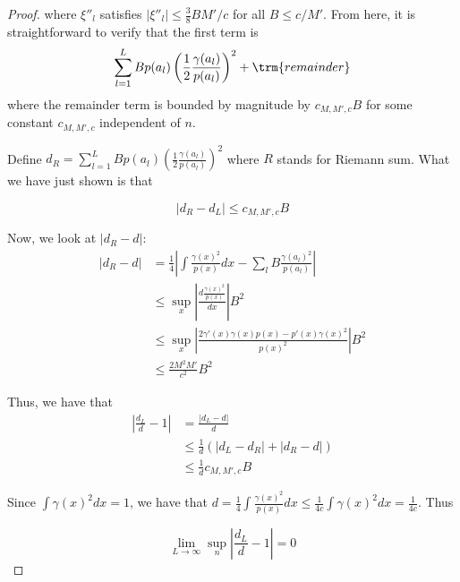 \documentclass{article}
\begin{document}
\begin{proof}
where $\xi''_l$ satisfies $| \xi''_l | \leq \frac{3}{8} B M'/c$ for all $B \leq c / M'$. From here, it is straightforward to verify that the first term is 
\[
\sum_{l=1}^L Bp(a_l) \left( \frac{1}{2} \frac{\gamma(a_l)}{p(a_l)} \right)^2 + \trm{remainder}
\]
where the remainder term is bounded by magnitude by $c_{M, M', c}B$ for some constant $c_{M, M', c}$ independent of $n$. 

Define $d_R = \sum_{l=1}^L B p(a_l) \left( \frac{1}{2} \frac{\gamma(a_l)}{p(a_l)} \right)^2 $ where $R$ stands for Riemann sum. What we have just shown is that

\[
| d_R - d_L | \leq c_{M, M', c} B 
\]

Now, we look at $| d_R - d |$:
\begin{align*}
|d_R - d| &= \frac{1}{4} \left| \int \frac{\gamma(x)^2}{p(x)} dx - \sum_l B \frac{\gamma(a_l)^2}{p(a_l)} \right| \\
 &\leq \sup_x \left| \frac{ d \frac{\gamma(x)^2}{p(x)} }{dx} \right| B^2 \\
 &\leq \sup_x \left| \frac{ 2 \gamma'(x) \gamma(x) p(x) - p'(x) \gamma(x)^2 }{p(x)^2} \right| B^2 \\
 &\leq \frac{2 M^2 M' }{c^2} B^2 
\end{align*}

Thus, we have that
\begin{align*}
\left|\frac{d_L}{d} - 1 \right| &= \frac{| d_L - d |}{d} \\
  &\leq \frac{1}{d} \left( |d_L - d_R| + |d_R - d| \right) \\
  &\leq \frac{1}{d} c_{M, M', c} B 
\end{align*}

Since $\int \gamma(x)^2 dx = 1$, we have that $d = \frac{1}{4} \int \frac{\gamma(x)^2}{p(x)} dx \leq \frac{1}{4c} \int \gamma(x)^2 dx = \frac{1}{4c}$. Thus

\[
\lim_{L \rightarrow \infty} \sup_n  \left| \frac{d_L}{d} - 1 \right| = 0
\]
 
\end{proof}
\end{document}
